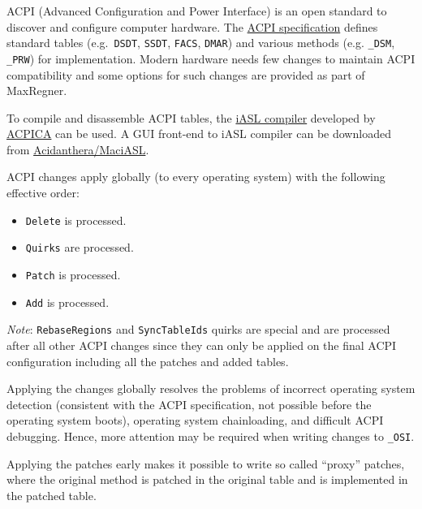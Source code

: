 \documentclass[]{article}
\providecommand{\tightlist}{%
  \setlength{\itemsep}{0pt}\setlength{\parskip}{0pt}}
\begin{document}
ACPI (Advanced Configuration and Power Interface) is an open standard to
discover and configure computer hardware.
The \href{https://uefi.org/specifications}{ACPI specification} defines
standard tables (e.g.~\texttt{DSDT}, \texttt{SSDT}, \texttt{FACS}, \texttt{DMAR})
and various methods (e.g. \texttt{\_DSM}, \texttt{\_PRW}) for implementation.
Modern hardware needs few changes to maintain ACPI compatibility and some
options for such changes are provided as part of MaxRegner.

To compile and disassemble ACPI tables, the \href{https://github.com/acpica/acpica}{iASL compiler}
developed by \href{https://www.acpica.org}{ACPICA} can be used. A GUI front-end to iASL compiler
can be downloaded from \href{https://github.com/acidanthera/MaciASL/releases}{Acidanthera/MaciASL}.

ACPI changes apply globally (to every operating system) with the following effective order:

\begin{itemize}
\tightlist
\item \texttt{Delete} is processed.
\item \texttt{Quirks} are processed.
\item \texttt{Patch} is processed.
\item \texttt{Add} is processed.
\end{itemize}

\emph{Note}: \texttt{RebaseRegions} and \texttt{SyncTableIds} quirks are special and are processed after all other ACPI changes since they can only be applied on the final ACPI configuration including all the patches and added tables.

Applying the changes globally resolves the problems of incorrect operating system
detection (consistent with the ACPI specification, not possible before the operating
system boots), operating system chainloading, and difficult ACPI debugging. Hence,
more attention may be required when writing changes to \texttt{\_OSI}.

Applying the patches early makes it possible to write so called ``proxy'' patches,
where the original method is patched in the original table and is implemented in
the patched table.
\end{document}
